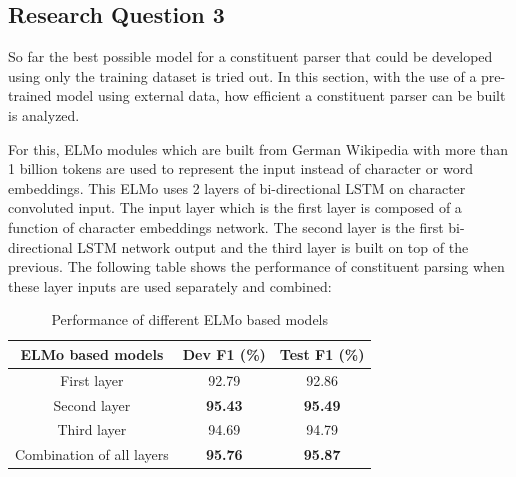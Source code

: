 \documentclass[a4paper, 11pt]{article}
\begin{document}


\pagebreak
\subsection{Research Question 3}
So far the best possible model for a constituent parser that could be developed using only the training dataset is tried out. In this section, with the use of a pre-trained model using external data, how efficient a constituent parser can be built is analyzed.

For this, ELMo modules which are built from German Wikipedia with more than 1 billion tokens are used to represent the input instead of character or word embeddings. This ELMo uses 2 layers of bi-directional LSTM on character convoluted input. The input layer which is the first layer is composed of a function of character embeddings network. The second layer is the first bi-directional LSTM network output and the third layer is built on top of the previous. The following table shows the performance of constituent parsing when these layer inputs are used separately and combined:

\begin{table}[h!]
  \begin{center}
    \label{tab:different-elmo-models}
    \def\arraystretch{1.5}%
    \begin{tabular}{c|c|c}
      ELMo based models & Dev F1 (\%) & Test F1 (\%) \\
      \hline
	  First layer & 92.79 & 92.86\\
      Second layer  & \textbf{95.43} & \textbf{95.49}\\
      Third layer & 94.69 & 94.79\\
      Combination of all layers & \textbf{95.76} & \textbf{95.87}\\     
    \end{tabular}
    \caption{Performance of different ELMo based models}
  \end{center}
\end{table}
\end{document}
